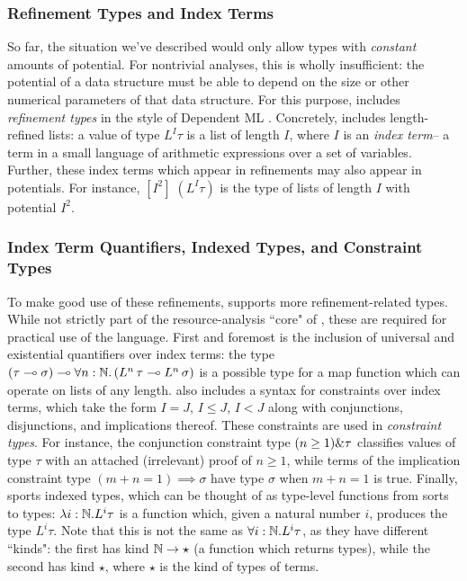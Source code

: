 \subsubsection{Refinement Types and Index Terms}
\label{sec:lambdaamor-overview-refty}
So far, the situation we've described would only allow types with \textit{constant} amounts of potential. For nontrivial analyses, this is wholly insufficient: the potential of a data structure must be able to depend on the size or other numerical parameters of that data structure. For this purpose, \lambdaamor includes \textit{refinement types} in the style of Dependent ML \cite{xi:jfp07}. Concretely, \lambdaamor includes length-refined lists: a value of type $L^I \tau$ is a list of length $I$, where $I$ is an \textit{index term}-- a term in a small language of arithmetic expressions over a set of variables. Further, these index terms which appear in refinements may also appear in potentials. For instance, $\left[I^2\right] \; (L^I \tau)$ is the type of lists of length $I$ with potential $I^2$. 

\subsubsection{Index Term Quantifiers, Indexed Types, and Constraint Types}
To make good use of these refinements, \lambdaamor supports more refinement-related types. While not strictly part of the resource-analysis ``core" of \lambdaamor, these are required for practical use of the language. First and foremost is the inclusion of universal and existential quantifiers over index terms: the type $(\tau \multimap \sigma) \multimap \forall n : \mathbb{N}. \left(L^n \,\tau \multimap L^{n} \, \sigma\right)$ is a possible type for a map function which can operate on lists of any length. \lambdaamor also includes a syntax for constraints over index terms, which take the form $I = J$, $I \leq J$, $I < J$ along with conjunctions, disjunctions, and implications thereof. These constraints are used in \textit{constraint types}. For instance, the conjunction constraint type $(n \geq 1) \& \tau$ classifies values of type $\tau$ with an attached (irrelevant) proof of $n \geq 1$, while terms of the implication constraint type $(m + n = 1) \implies \sigma$ have type $\sigma$ when $m + n = 1$ is true. Finally, \lambdaamor sports indexed types, which can be thought of as type-level functions from sorts to types: $\lambda i : \mathbb{N}. L^i \tau$ is a function which, given a natural number $i$, produces the type $L^i \tau$. Note that this is not the same as $\forall i: \mathbb{N}. L^i \tau$, as they have different ``kinds": the first has kind $\mathbb{N} \to \star$ (a function which returns types), while the second has kind $\star$, where $\star$ is the kind of types of terms.

